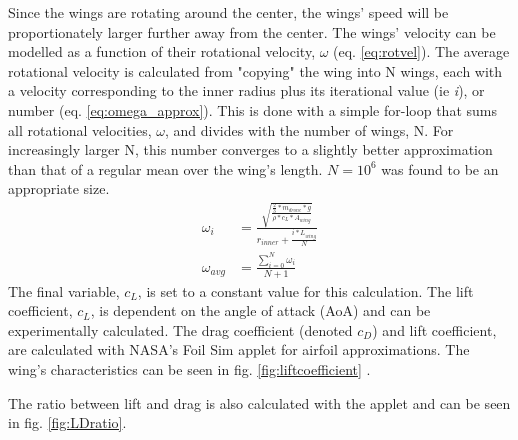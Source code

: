 Since the wings are rotating around the center, the wings' speed will be proportionately larger further away from the center. The wings' velocity can be modelled as a function of their rotational velocity, $\omega$ (eq. \ref{eq:rotvel}). 
The average rotational velocity is calculated from "copying" the wing into N wings, each with a velocity corresponding to the inner radius plus its iterational value (ie \textit{i}), or number (eq. \ref{eq:omega_approx}). This is done with a simple for-loop that sums all rotational velocities, $\omega$, and divides with the number of wings, N. For increasingly larger N, this number converges to a slightly better approximation than that of a regular mean over the wing's length. $N=10^6$ was found to be an appropriate size. 
\begin{align}\label{eq:rotvel}
    \omega_i &= \frac{\sqrt{\frac{\frac{2}{3}*m_{drone}*g}{\rho*c_L*A_{wing}}}}{r_{inner}+\frac{i*L_{wing}}{N}}\\
    \omega_{avg} &= \frac{\sum_{i=0}^{N} \omega_i}{N+1}
    \label{eq:omega_approx}
\end{align}
The final variable, $c_L$, is set to a constant value for this calculation.
The lift coefficient, $c_L$, is dependent on the angle of attack (AoA) and can be experimentally calculated. The drag coefficient (denoted $c_D$) and lift coefficient, are calculated with NASA's Foil Sim applet for airfoil approximations. The wing's characteristics can be seen in fig. \ref{fig:liftcoefficient} \cite{lift_coefficient}.

The ratio between lift and drag is also calculated with the applet and can be seen in fig. \ref{fig:LDratio}.


